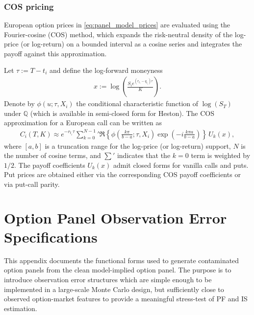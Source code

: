 \documentclass[11pt,a4paper,notitlepage]{article}
\numberwithin{equation}{section}
\begin{document}
\subsubsection{COS pricing}
European option prices in \eqref{eq:panel_model_prices} are evaluated using the Fourier-cosine (COS)
method, which expands the risk-neutral density of the log-price (or log-return) on a bounded interval
as a cosine series and integrates the payoff against this approximation.

Let $\tau:=T-t_i$ and define the log-forward moneyness
\begin{align}
x:=\log\!\left(\frac{S_i e^{(r_{t_i}-q_{t_i})\tau}}{K}\right).
\end{align}
Denote by $\phi(u;\tau,X_i)$ the conditional characteristic function of $\log(S_T)$ under $\mathbb{Q}$
(which is available in semi-closed form for Heston). The COS approximation for a European call can be
written as
\begin{align}
C_i(T,K) \approx e^{-r_{t_i}\tau}\sum_{k=0}^{N-1}{}'
\Re\!\left\{\phi\!\left(\frac{k\pi}{b-a};\tau,X_i\right)\exp\!\left(-i\frac{k\pi a}{b-a}\right)\right\}
\,U_k(x),
\label{eq:COS_call}
\end{align}
where $[a,b]$ is a truncation range for the log-price (or log-return) support, $N$ is the number of cosine
terms, and $\sum'$ indicates that the $k=0$ term is weighted by $1/2$. The payoff coefficients $U_k(x)$
admit closed forms for vanilla calls and puts. Put prices are obtained either via the corresponding COS payoff
coefficients or via put-call parity.

\section{Option Panel Observation Error Specifications}
\label{app:option_noise_specs}

This appendix documents the functional forms used to generate contaminated option panels from the clean model-implied
option panel. The purpose is to introduce observation error structures which are simple enough to be implemented in a
large-scale Monte Carlo design, but sufficiently close to observed option-market features to provide a meaningful
stress-test of PF and IS estimation.
\end{document}
